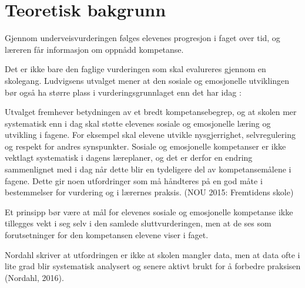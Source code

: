 \documentclass[main.tex]{subfiles}
\begin{document}
\section*{Teoretisk bakgrunn}
Gjennom underveisvurderingen følges elevenes progresjon
i faget over tid, og læreren får informasjon
om oppnådd kompetanse.

Det er ikke bare den faglige vurderingen som skal evalureres gjennom en skolegang. Ludvigsens utvalget mener
at den sosiale og emosjonelle utviklingen bør også ha større plass i vurderingsgrunnlaget enn det har idag :
\begin{displayquote}
Utvalget fremhever betydningen av et bredt kompetansebegrep,
og at skolen mer systematisk enn
i dag skal støtte elevenes sosiale og emosjonelle
læring og utvikling i fagene. For eksempel skal
elevene utvikle nysgjerrighet, selvregulering og
respekt for andres synspunkter. Sosiale og emosjonelle
kompetanser er ikke vektlagt systematisk
i dagens læreplaner, og det er derfor en endring
sammenlignet med i dag når dette blir en tydeligere
del av kompetansemålene i fagene. Dette
gir noen utfordringer som må håndteres på en
god måte i bestemmelser for vurdering og i lærernes
praksis. (NOU 2015: Fremtidens skole)
\end{displayquote}

Et prinsipp bør være at mål for elevenes sosiale
og emosjonelle kompetanse ikke tillegges vekt
i seg selv i den samlede sluttvurderingen, men at
de ses som forutsetninger for den kompetansen
elevene viser i faget.

Nordahl skriver at utfordringen er ikke at skolen mangler data, men at data ofte i lite grad blir
systematisk analysert og senere aktivt brukt for å forbedre praksisen (Nordahl, 2016).
\end{document}
